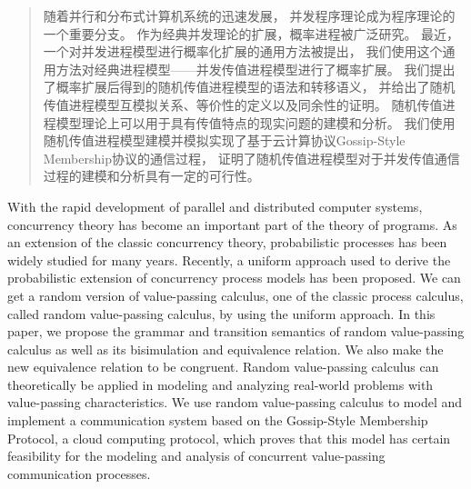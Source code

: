 
\begin{abstract}
  随着并行和分布式计算机系统的迅速发展，
  并发程序理论成为程序理论的一个重要分支。
  作为经典并发理论的扩展，概率进程被广泛研究。
  最近，一个对并发进程模型进行概率化扩展的通用方法被提出，
  我们使用这个通用方法对经典进程模型——并发传值进程模型进行了概率扩展。
  我们提出了概率扩展后得到的随机传值进程模型的语法和转移语义，
  并给出了随机传值进程模型互模拟关系、等价性的定义以及同余性的证明。
  随机传值进程模型理论上可以用于具有传值特点的现实问题的建模和分析。
  我们使用随机传值进程模型建模并模拟实现了基于云计算协议Gossip-Style Membership协议的通信过程，
  证明了随机传值进程模型对于并发传值通信过程的建模和分析具有一定的可行性。
\end{abstract}

\begin{abstract*}
  With the rapid development of parallel and distributed computer systems,
  concurrency theory has become an important part of the theory of programs.
  As an extension of the classic concurrency theory,
  probabilistic processes has been widely studied for many years.
  Recently, a uniform approach used to derive the probabilistic extension of 
  concurrency process models has been proposed.
  We can get a random version of value-passing calculus,
  one of the classic process calculus, called random value-passing calculus, 
  by using the uniform approach.
  In this paper, we propose the grammar and transition semantics of random value-passing calculus
  as well as its bisimulation and equivalence relation.
  We also make the new equivalence relation to be congruent. 
  Random value-passing calculus can theoretically 
  be applied in modeling and analyzing real-world problems with value-passing characteristics.
  We use random value-passing calculus to model and implement
  a communication system based on the Gossip-Style Membership Protocol, a cloud computing protocol,
  which proves that this model has certain feasibility 
  for the modeling and analysis of concurrent value-passing communication processes.
\end{abstract*}
